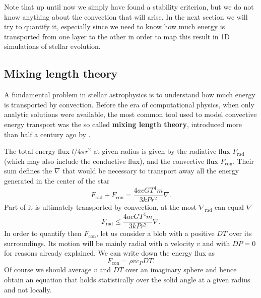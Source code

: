 Note that up until now we simply have found a stability criterion, but we do not know anything about the convection that will arise. In the next section we will try to quantify it, especially since we need to know how much energy is transported from one layer to the other in order to map this result in 1D simulations of stellar evolution.

\subsection{Mixing length theory}
A fundamental problem in stellar astrophysics is to understand how much energy is transported by convection. Before the era of computational physics, when only analytic solutions were available, the most common tool used to model convective energy transport was the so called \textbf{mixing length theory}, introduced more than half a century ago by \citet{bohm}. 

The total energy flux $l/4 \pi r^2$ at given radius is given by the radiative flux $F_{\mathrm{rad}}$ (which may also include the conductive flux), and the convective flux $F_{\mathrm{con}}$. Their sum defines the $\nabla$ that would be necessary to transport away all the energy generated in the center of the star
\begin{equation}\label{7.1}
F_{\mathrm{rad}}+ F_{\mathrm{con}}= \frac{4 a c G T^4 m }{3 k P r^2} \nabla.
\end{equation}
Part of it is ultimately transported by convection, at the most $\nabla_{\mathrm{rad}}$ can equal $\nabla$
\begin{equation}\label{7.2}
F_{\mathrm{rad}} \leq \frac{4 a c G T^4 m}{3 k P r^2} \nabla.
\end{equation}
In order to quantify then $F_{\mathrm{con}}$, let us consider a blob with a positive $DT$ over its surroundings. Its motion will be mainly radial with a velocity $v$ and with $DP=0$ for reasons already explained. We can write down the energy flux as
\begin{equation}\label{fconv}
	F_{\mathrm{con}}=\rho  v  c_P  DT.
\end{equation}
Of course we should average $v$ and $DT$ over an imaginary sphere and hence obtain an equation that holds statistically over the solid angle at a given radius and not locally. 

